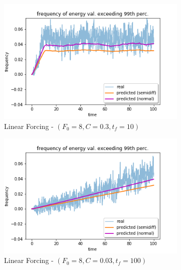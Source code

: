 \documentclass{article}
\begin{document}
\begin{figure}[!ht]
	\centering
	\begin{subfigure}[b]{0.48\textwidth}
		\includegraphics[width=1\linewidth]{fig/pred_energy_exceed_099q_L_03_10_2.png}
		\caption{Linear Forcing - $(F_0=8, C=0.3, t_f=10)$}
		\label{fig:pred_energy_exceed_099q_L_03_10_comp}
	\end{subfigure}%
	\begin{subfigure}[b]{0.48\textwidth}
		\includegraphics[width=1\linewidth]{fig/pred_energy_exceed_099q_L_003_100_2.png}
		\caption{Linear Forcing - $(F_0=8, C=0.03, t_f=100)$}
		\label{fig:pred_energy_exceed_099q_L_003_100_comp}
	\end{subfigure}
	\begin{subfigure}[b]{0.48\textwidth}

\end{subfigure}
\end{figure}
\end{document}

